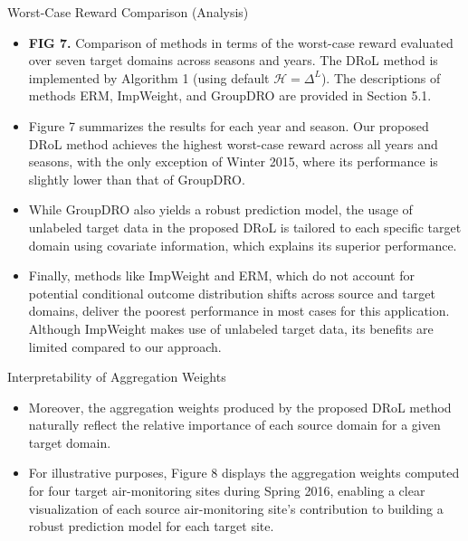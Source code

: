\documentclass{beamer}
\begin{document}
\begin{frame}{Worst-Case Reward Comparison (Analysis)}
    \begin{itemize}
        \item \textbf{FIG 7.} Comparison of methods in terms of the worst-case reward evaluated over seven target domains across seasons and years. The DRoL method is implemented by Algorithm 1 (using default $\mathcal{H} = \Delta^{L}$). The descriptions of methods ERM, ImpWeight, and GroupDRO are provided in Section 5.1.
        \item Figure 7 summarizes the results for each year and season. Our proposed DRoL method achieves the highest worst-case reward across all years and seasons, with the only exception of Winter 2015, where its performance is slightly lower than that of GroupDRO.
        \item While GroupDRO also yields a robust prediction model, the usage of unlabeled target data in the proposed DRoL is tailored to each specific target domain using covariate information, which explains its superior performance.
        \item Finally, methods like ImpWeight and ERM, which do not account for potential conditional outcome distribution shifts across source and target domains, deliver the poorest performance in most cases for this application. Although ImpWeight makes use of unlabeled target data, its benefits are limited compared to our approach.
    \end{itemize}
\end{frame}

\begin{frame}{Interpretability of Aggregation Weights}
    \begin{itemize}
        \item Moreover, the aggregation weights produced by the proposed DRoL method naturally reflect the relative importance of each source domain for a given target domain.
        \item For illustrative purposes, Figure 8 displays the aggregation weights computed for four target air-monitoring sites during Spring 2016, enabling a clear visualization of each source air-monitoring site’s contribution to building a robust prediction model for each target site.
    \end{itemize}
\end{frame}
\end{document}
